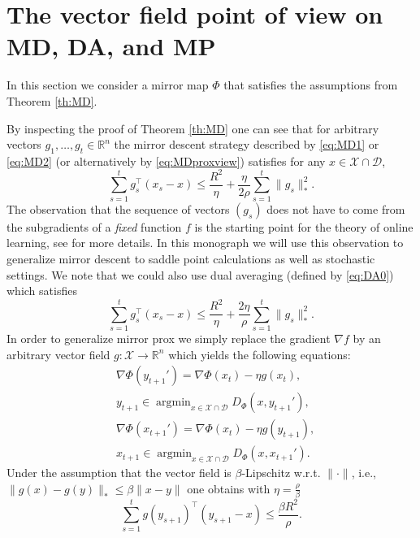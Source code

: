 \documentclass[openany]{now}
\newcommand{\R}{\mathbb{R}}
\newcommand{\cX}{\mathcal{X}}
\newcommand{\cD}{\mathcal{D}}
\newcommand{\argmin}{\mathop{\mathrm{argmin}}}
\begin{document}
\section{The vector field point of view on MD, DA, and MP} \label{sec:vectorfield}
In this section we consider a mirror map $\Phi$ that satisfies the assumptions from Theorem \ref{th:MD}.

By inspecting the proof of Theorem \ref{th:MD} one can see that for arbitrary vectors $g_1, \hdots, g_t \in \R^n$ the mirror descent strategy described by \eqref{eq:MD1} or \eqref{eq:MD2} (or alternatively by \eqref{eq:MDproxview}) satisfies for any $x \in \cX \cap \cD$,
\begin{equation} \label{eq:vfMD}
\sum_{s=1}^t g_s^{\top} (x_s - x) \leq \frac{R^2}{\eta} + \frac{\eta}{2 \rho} \sum_{s=1}^t \|g_s\|_*^2 .
\end{equation}
The observation that the sequence of vectors $(g_s)$ does not have to come from the subgradients of a {\em fixed} function $f$ is the starting point for the theory of online learning, see \cite{Bub11} for more details. In this monograph we will use this observation to generalize mirror descent to saddle point calculations as well as stochastic settings. We note that we could also use dual averaging (defined by \eqref{eq:DA0}) which satisfies
$$\sum_{s=1}^t g_s^{\top} (x_s - x) \leq \frac{R^2}{\eta} + \frac{2 \eta}{\rho} \sum_{s=1}^t \|g_s\|_*^2 .$$
In order to generalize mirror prox we simply replace the gradient $\nabla f$ by an arbitrary vector field $g: \cX \rightarrow \R^n$ which yields the following equations:
\begin{align*}
& \nabla \Phi(y_{t+1}') = \nabla \Phi(x_{t}) - \eta g(x_t), \\
& y_{t+1} \in \argmin_{x \in \mathcal{X} \cap \mathcal{D}} D_{\Phi}(x,y_{t+1}') , \\ 
& \nabla \Phi(x_{t+1}') = \nabla \Phi(x_{t}) - \eta g(y_{t+1}), \\
& x_{t+1} \in \argmin_{x \in \mathcal{X} \cap \mathcal{D}} D_{\Phi}(x,x_{t+1}') .
\end{align*}
Under the assumption that the vector field is $\beta$-Lipschitz w.r.t. $\|\cdot\|$, i.e., $\|g(x) - g(y)\|_* \leq \beta \|x-y\|$ one obtains with $\eta = \frac{\rho}{\beta}$
\begin{equation} \label{eq:vfMP}
\sum_{s=1}^t g(y_{s+1})^{\top}(y_{s+1} - x) \leq \frac{\beta R^2}{\rho}.
\end{equation} 
\end{document}
